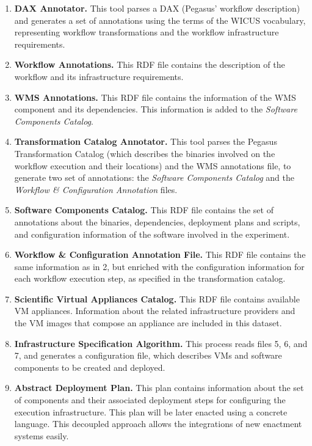 \begin{enumerate}
	\item \textbf{DAX Annotator.} This tool parses a DAX (Pegasus' workflow description) 
		and generates a set of annotations using the terms of the WICUS vocabulary, 
		representing workflow transformations and the workflow infrastructure requirements.

	\item \textbf{Workflow Annotations.} This RDF file contains the description of the workflow 
		and its infrastructure requirements.

	\item \textbf{WMS Annotations.} This RDF file contains the information of the WMS component 
		and its dependencies. This information is added to the \emph{Software Components 
		Catalog}.

	\item \textbf{Transformation Catalog Annotator.} This tool parses the Pegasus Transformation 
		Catalog (which describes the binaries involved on the workflow execution and their locations) 
		and the WMS annotations file, to generate two set of annotations: the \emph{Software 
		Components Catalog} and the \emph{Workflow \& Configuration Annotation} files.

	\item \textbf{Software Components Catalog.} This RDF file contains the set of annotations about 
		the binaries, dependencies, deployment plans and scripts, and configuration information of 
		the software involved in the experiment.

	\item \textbf{Workflow \& Configuration Annotation File.} This RDF file contains the same information 
		as in 2, but enriched with the configuration information for each workflow execution step, as 
		specified in the transformation catalog.

	\item \textbf{Scientific Virtual Appliances Catalog.} This RDF file contains available VM appliances. 
		Information about the related infrastructure providers and the VM images that compose an 
		appliance are included in this dataset.

	\item \textbf{Infrastructure Specification Algorithm.} This process reads files 5, 6, and 7, and 
		generates a configuration file, which describes VMs and software 
		components to be created and deployed.

	\item \textbf{Abstract Deployment Plan.} This plan contains information about the set of components 
		and their associated deployment steps for configuring the execution infrastructure. This plan 
		will be later enacted using a concrete language. This decoupled approach allows the integrations of
		new enactment  systems easily.
		

\end{enumerate}
